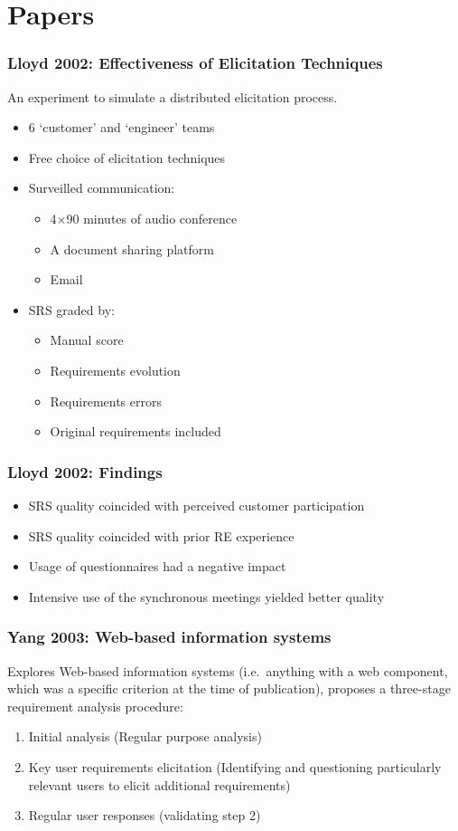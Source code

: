 \documentclass{beamer}
\begin{document}
\section{Papers}

\begin{frame}
\frametitle{Lloyd 2002: Effectiveness of Elicitation Techniques}
An experiment to simulate a distributed elicitation process.

\begin{itemize}
\item 6 `customer' and `engineer' teams
\item Free choice of elicitation techniques
\item Surveilled communication:
  \begin{itemize}
  \item 4$\times$90 minutes of audio conference
  \item A document sharing platform
  \item Email
  \end{itemize}
\item SRS graded by:
  \begin{itemize}
  \item Manual score
  \item Requirements evolution
  \item Requirements errors
  \item Original requirements included
  \end{itemize}
\end{itemize}
\end{frame}

\begin{frame}
\frametitle{Lloyd 2002: Findings}
\begin{itemize}
\item SRS quality coincided with perceived customer participation
\item SRS quality coincided with prior RE experience
\item Usage of questionnaires had a negative impact
\item Intensive use of the synchronous meetings yielded better quality
\end{itemize}
\end{frame}


\begin{frame}
\frametitle{Yang 2003: Web-based information systems}
Explores Web-based information systems (i.e.\ anything with a web component, which was a specific criterion at the time of publication), proposes a three-stage requirement analysis procedure:
\begin{enumerate}
\item Initial analysis (Regular purpose analysis)
\item Key user requirements elicitation (Identifying and questioning particularly relevant users to elicit additional requirements)
\item Regular user responses (validating step 2)
\end{enumerate}
\end{frame}
\end{document}
